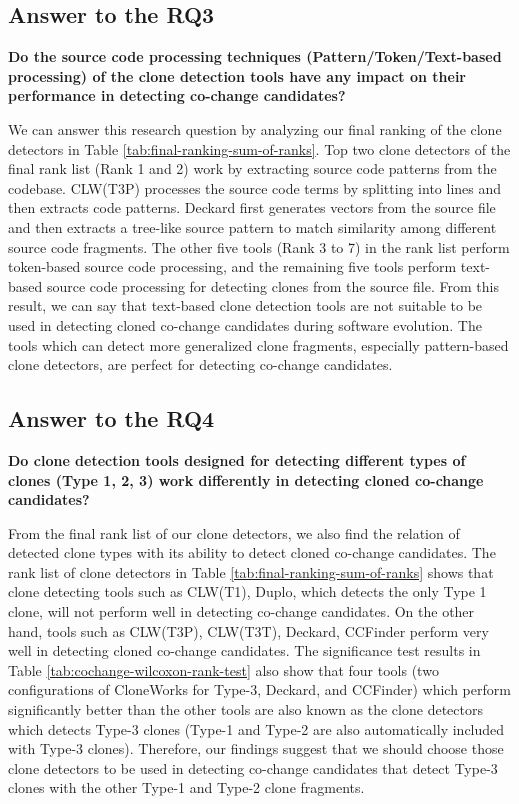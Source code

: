\documentclass[review]{elsarticle}
\begin{document}
\subsection{Answer to the \textbf{RQ3}}
\textbf{Do the source code processing techniques (Pattern/Token/Text-based processing) of the clone detection tools have any impact on their performance in detecting co-change candidates?}

We can answer this research question by analyzing our final ranking of the clone detectors in Table \ref{tab:final-ranking-sum-of-ranks}. Top two clone detectors of the final rank list (Rank 1 and 2) work by extracting source code patterns from the codebase. CLW(T3P) processes the source code terms by splitting into lines and then extracts code patterns. Deckard first generates vectors from the source file and then extracts a tree-like source pattern to match similarity among different source code fragments. The other five tools (Rank 3 to 7) in the rank list perform token-based source code processing, and the remaining five tools perform text-based source code processing for detecting clones from the source file. From this result, we can say that text-based clone detection tools are not suitable to be used in detecting cloned co-change candidates during software evolution. The tools which can detect more generalized clone fragments, especially pattern-based clone detectors, are perfect for detecting co-change candidates. 

\subsection{Answer to the \textbf{RQ4}}
\textbf{Do clone detection tools designed for detecting different types of clones (Type 1, 2, 3) work differently in detecting cloned co-change candidates?}

From the final rank list of our clone detectors, we also find the relation of detected clone types with its ability to detect cloned co-change candidates. The rank list of clone detectors in Table \ref{tab:final-ranking-sum-of-ranks} shows that clone detecting tools such as CLW(T1), Duplo, which detects the only Type 1 clone, will not perform well in detecting co-change candidates. On the other hand, tools such as CLW(T3P), CLW(T3T), Deckard, CCFinder perform very well in detecting cloned co-change candidates. The significance test results in Table \ref{tab:cochange-wilcoxon-rank-test} also show that four tools (two configurations of CloneWorks for Type-3, Deckard, and CCFinder) which perform significantly better than the other tools are also known as the clone detectors which detects Type-3 clones (Type-1 and Type-2 are also automatically included with Type-3 clones). Therefore, our findings suggest that we should choose those clone detectors to be used in detecting co-change candidates that detect Type-3 clones with the other Type-1 and Type-2 clone fragments. 
\end{document}
